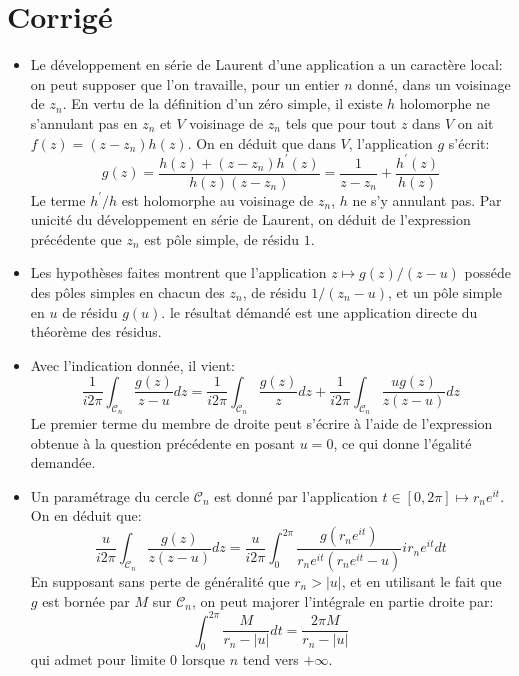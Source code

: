 \documentclass[a4paper,12pt]{amsart}
\begin{document}
\section*{Corrigé}
\begin{itemize}
\item Le développement en série de Laurent d'une application a un caractère local: on peut supposer que l'on travaille, pour un entier $n$ donné, dans un voisinage de $z_n$. En vertu de la définition d'un zéro simple, il existe $h$ holomorphe ne s'annulant pas en $z_n$ et $V$ voisinage de $z_n$ tels que pour tout $z$ dans $V$ on ait $f(z) = (z-z_n)h(z)$. On en déduit que dans $V$, l'application $g$ s'écrit:
\begin{equation}
g(z) = \frac{h(z) + (z-z_n)h^\prime(z)}{h(z)(z-z_n)} = \frac{1}{z-z_n} + \frac{h^\prime(z)}{h(z)}
\end{equation}
Le terme $h^\prime/h$ est holomorphe au voisinage de $z_n$, $h$ ne s'y annulant pas. Par unicité du développement en série de Laurent, on déduit de l'expression précédente que $z_n$ est pôle simple, de résidu $1$.
\item Les hypothèses faites montrent que l'application $z \mapsto g(z)/(z-u)$ posséde des pôles simples en chacun des $z_n$, de résidu $1/(z_n-u)$, et un pôle simple en $u$ de résidu $g(u)$. le résultat démandé est une application directe du théorème des résidus. 
\item Avec l'indication donnée, il vient:
\begin{equation}
\frac{1}{i 2 \pi} \int_{\mathcal{C}_n}\frac{g(z)}{z-u} dz = \frac{1}{i 2 \pi} \int_{\mathcal{C}_n}\frac{g(z)}{z} dz + 
 \frac{1}{i 2 \pi} \int_{\mathcal{C}_n}\frac{u g(z)}{z(z-u)} dz
\end{equation}
Le premier terme du membre de droite peut s'écrire à l'aide de l'expression obtenue à la question précédente en posant $u = 0$, ce qui donne l'égalité demandée.
\item Un paramétrage du cercle $\mathcal{C}_n$ est donné par l'application $t \in [0,2\pi] \mapsto r_n e^{it}$. On en déduit que:
\begin{equation}
\frac{u}{i 2 \pi} \int_{\mathcal{C}_n}\frac{g(z)}{z(z-u)} dz = \frac{u}{i 2 \pi} \int_0^{2\pi} \frac{g\left(r_n e^{it}
\right)}{r_n e^{it}(r_n e^{it}-u)} i r_n e^{it} dt
\end{equation}
En supposant sans perte de généralité que $r_n > |u|$, et en utilisant le fait que $g$ est bornée par $M$ sur $\mathcal{C}_n$, on peut majorer l'intégrale en partie droite par:
\begin{equation}
\int_0^{2\pi} \frac{M}{r_n - |u|} dt = \frac{2 \pi M}{r_n -|u|}
\end{equation}
qui admet pour limite $0$ lorsque $n$ tend vers $+\infty$.
\end{itemize}
\end{document}
